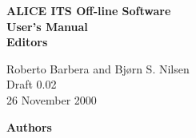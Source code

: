 \documentclass{report}
\begin{document}
\begin{center}
\huge\bf ALICE ITS Off-line Software 
\\[0.25cm]
\huge\bf User's Manual
\\[1cm]
\normalsize
Editors

Roberto Barbera and Bj\o rn S. Nilsen
\\[1cm]
Draft 0.02\\
26 November 2000
\end{center}

\newpage

\noindent 
{\Large\bf{Authors}}
\\[0.25cm]


\tableofcontents












\end{document}

